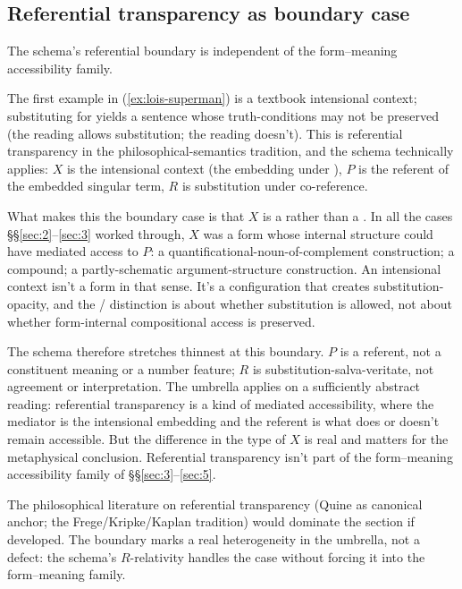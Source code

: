 \subsection{Referential transparency as boundary case}\label{sec:4-3}

The schema's referential boundary is independent of the form--meaning accessibility family.

\ea\label{ex:lois-superman}
\ea {}
\ex {}
\z
\z

The first example in (\ref{ex:lois-superman}) is a textbook intensional context; substituting  for  yields a sentence whose truth-conditions may not be preserved (the  reading allows substitution; the  reading doesn't). This is referential transparency in the philosophical-semantics tradition, and the schema technically applies: $X$ is the intensional context (the embedding under ), $P$ is the referent of the embedded singular term, $R$ is substitution under co-reference.

What makes this the boundary case is that $X$ is a  rather than a . In all the cases §§\ref{sec:2}--\ref{sec:3} worked through, $X$ was a form whose internal structure could have mediated access to $P$: a quantificational-noun-of-complement construction; a compound; a partly-schematic argument-structure construction. An intensional context isn't a form in that sense. It's a configuration that creates substitution-opacity, and the / distinction is about whether substitution is allowed, not about whether form-internal compositional access is preserved.

The schema therefore stretches thinnest at this boundary. $P$ is a referent, not a constituent meaning or a number feature; $R$ is substitution-salva-veritate, not agreement or interpretation. The umbrella applies on a sufficiently abstract reading: referential transparency is a kind of mediated accessibility, where the mediator is the intensional embedding and the referent is what does or doesn't remain accessible. But the difference in the type of $X$ is real and matters for the metaphysical conclusion. Referential transparency isn't part of the form--meaning accessibility family of §§\ref{sec:3}--\ref{sec:5}.

The philosophical literature on referential transparency (Quine \autocite*{quine-1956-quantifiers-propositional-attitudes} as canonical anchor; the Frege/Kripke/Kaplan tradition) would dominate the section if developed. The boundary marks a real heterogeneity in the umbrella, not a defect: the schema's $R$-relativity handles the case without forcing it into the form--meaning family.

